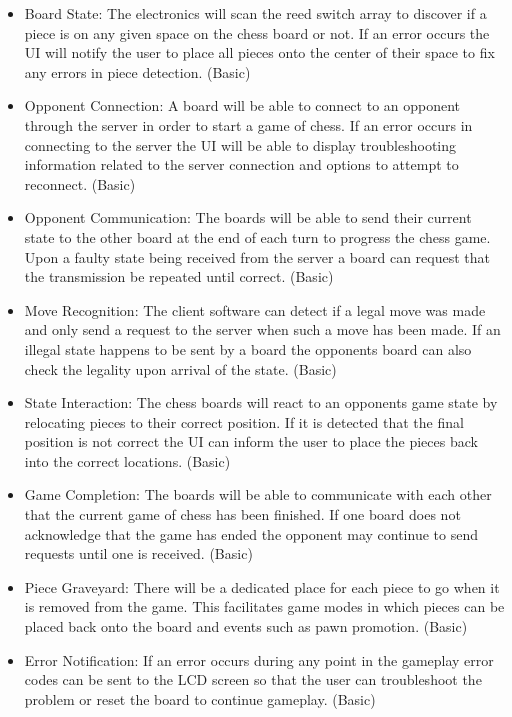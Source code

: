 \documentclass{article}
\begin{document}
\begin{itemize}


	\item Board State: The electronics will scan the reed switch array to discover if a piece is on any given space on the chess board or not. If an error occurs the UI will notify the user to place all pieces onto the center of their space to fix any errors in piece detection. (Basic)
	\item Opponent Connection: A board will be able to connect to an opponent through the server in order to start a game of chess. If an error occurs in connecting to the server the UI will be able to display troubleshooting information related to the server connection and options to attempt to reconnect. (Basic)
	\item Opponent Communication: The boards will be able to send their current state to the other board at the end of each turn to progress the chess game. Upon a faulty state being received from the server a board can request that the transmission be repeated until correct. (Basic)
	\item Move Recognition: The client software can detect if a legal move was made and only send a request to the server when such a move has been made. If an illegal state happens to be sent by a board the opponents board can also check the legality upon arrival of the state. (Basic)
	\item State Interaction: The chess boards will react to an opponents game state by relocating pieces to their correct position. If it is detected that the final position is not correct the UI can inform the user to place the pieces back into the correct locations. (Basic)
	\item Game Completion: The boards will be able to communicate with each other that the current game of chess has been finished. If one board does not acknowledge that the game has ended the opponent may continue to send requests until one is received. (Basic)
	\item Piece Graveyard: There will be a dedicated place for each piece to go when it is removed from the game. This facilitates game modes in which pieces can be placed back onto the board and events such as pawn promotion. (Basic)
	\item Error Notification: If an error occurs during any point in the gameplay error codes can be sent to the LCD screen so that the user can troubleshoot the problem or reset the board to continue gameplay. (Basic)


\end{itemize}
\end{document}
